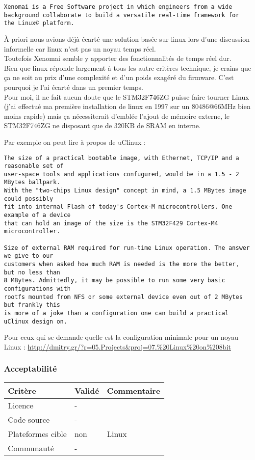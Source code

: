 \begin{verbatim}
Xenomai is a Free Software project in which engineers from a wide
background collaborate to build a versatile real-time framework for
the Linux© platform.
\end{verbatim}

À priori nous avions déjà écarté une solution basée sur linux lors d'une discussion
informelle car linux n'est pas un noyau temps réel.\\

Toutefois Xenomai semble y apporter des fonctionnalités de temps réel dur.\\

Bien que linux réponde largement à tous les autre critères technique, je crains que
ça ne soit au prix d'une complexité et d'un poids exagéré du firmware. C'est pourquoi
je l'ai écarté dans un premier temps.\\

Pour moi, il ne fait aucun doute que le STM32F746ZG puisse faire tourner Linux (j'ai 
effectué ma première installation de linux en 1997 sur un 80486@66MHz bien moins
rapide) mais ça nécessiterait d'emblée l'ajout de mémoire externe, le STM32F746ZG ne
disposant que de 320KB de SRAM en interne.

Par exemple on peut lire à propos de uClinux \cite{ref9} :
{\small
\begin{verbatim}
The size of a practical bootable image, with Ethernet, TCP/IP and a reasonable set of
user-space tools and applications confugured, would be in a 1.5 - 2 MBytes ballpark.
With the "two-chips Linux design" concept in mind, a 1.5 MBytes image could possibly
fit into internal Flash of today's Cortex-M microcontrollers. One example of a device
that can hold an image of the size is the STM32F429 Cortex-M4 microcontroller.

Size of external RAM required for run-time Linux operation. The answer we give to our
customers when asked how much RAM is needed is the more the better, but no less than
8 MBytes. Admittedly, it may be possible to run some very basic configurations with
rootfs mounted from NFS or some external device even out of 2 MBytes but frankly this
is more of a joke than a configuration one can build a practical uClinux design on.
\end{verbatim}
}

Pour ceux qui se demande quelle-est la configuration minimale pour un noyau Linux :
\url{http://dmitry.gr/?r=05.Projects&proj=07.%20Linux%20on%208bit} 

\subsubsection{Acceptabilité}
\begin{tabular}{lll}
\toprule
	Critère				&	Validé		&	Commentaire	\\
\midrule
	Licence				&	-			&		\\
	Code source			&	-			&		\\
	Plateformes cible	&	non			&	Linux	\\
	Communauté			&	-			&		\\
\bottomrule
\end{tabular}

